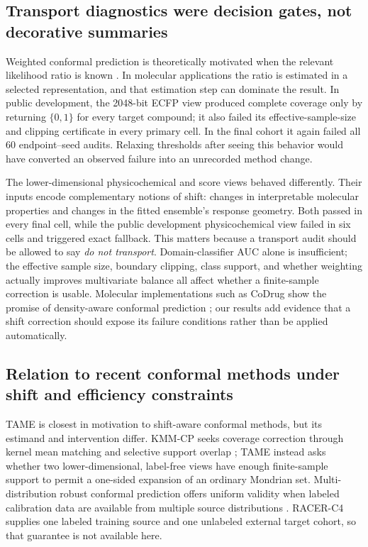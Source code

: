 \subsection{Transport diagnostics were decision gates, not decorative summaries}

Weighted conformal prediction is theoretically motivated when the relevant likelihood ratio is known \citep{tibshirani2019covariate}. In molecular applications the ratio is estimated in a selected representation, and that estimation step can dominate the result. In public development, the 2048-bit ECFP view produced complete coverage only by returning $\{0,1\}$ for every target compound; it also failed its effective-sample-size and clipping certificate in every primary cell. In the final cohort it again failed all 60 endpoint--seed audits. Relaxing thresholds after seeing this behavior would have converted an observed failure into an unrecorded method change.

The lower-dimensional physicochemical and score views behaved differently. Their inputs encode complementary notions of shift: changes in interpretable molecular properties and changes in the fitted ensemble's response geometry. Both passed in every final cell, while the public development physicochemical view failed in six cells and triggered exact fallback. This matters because a transport audit should be allowed to say \emph{do not transport}. Domain-classifier AUC alone is insufficient; the effective sample size, boundary clipping, class support, and whether weighting actually improves multivariate balance all affect whether a finite-sample correction is usable. Molecular implementations such as CoDrug show the promise of density-aware conformal prediction \citep{laghuvarapu2023codrug}; our results add evidence that a shift correction should expose its failure conditions rather than be applied automatically.

\subsection{Relation to recent conformal methods under shift and efficiency constraints}

TAME is closest in motivation to shift-aware conformal methods, but its estimand and intervention differ. KMM-CP seeks coverage correction through kernel mean matching and selective support overlap \citep{laghuvarapu2026kmmcp}; TAME instead asks whether two lower-dimensional, label-free views have enough finite-sample support to permit a one-sided expansion of an ordinary Mondrian set. Multi-distribution robust conformal prediction offers uniform validity when labeled calibration data are available from multiple source distributions \citep{yang2026multidistribution}. RACER-C4 supplies one labeled training source and one unlabeled external target cohort, so that guarantee is not available here.

